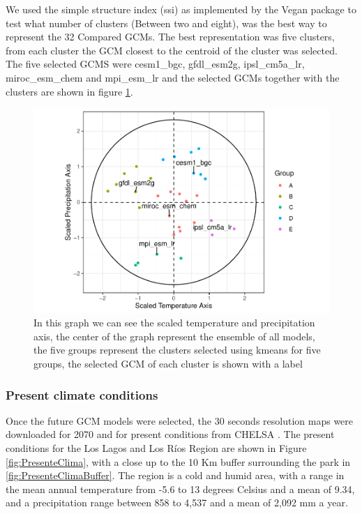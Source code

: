 \documentclass[]{article}
\begin{document}
We used the simple structure index (ssi) as implemented by the Vegan package \citep{Oksanen_2019, dolnicar1999tale} to test what number of clusters (Between two and eight), was the best way to represent the 32 Compared GCMs. The best representation was five clusters, from each cluster the GCM closest to the centroid of the cluster was selected. The five selected GCMS were cesm1\_bgc, gfdl\_esm2g, ipsl\_cm5a\_lr, miroc\_esm\_chem and mpi\_esm\_lr and the selected GCMs together with the clusters are shown in figure \ref{fig:SelectedGCMs}.

\begin{figure}
\centering
\includegraphics{Review_and_climate_files/figure-latex/SelectedGCMs-1.pdf}
\caption{\label{fig:SelectedGCMs}In this graph we can see the scaled temperature and precipitation axis, the center of the graph represent the ensemble of all models, the five groups represent the clusters selected using kmeans for five groups, the selected GCM of each cluster is shown with a label}
\end{figure}

\hypertarget{present-climate-conditions}{%
\subsubsection{Present climate conditions}\label{present-climate-conditions}}

Once the future GCM models were selected, the 30 seconds resolution maps were downloaded for 2070 and for present conditions from CHELSA \citep{karger2020high}.
The present conditions for the Los Lagos and Los Ríos Region are shown in Figure \ref{fig:PresenteClima}, with a close up to the 10 Km buffer surrounding the park in \ref{fig:PresenteClimaBuffer}. The region is a cold and humid area, with a range in the mean annual temperature from -5.6 to 13 degrees Celsius and a mean of 9.34, and a precipitation range between 858 to 4,537 and a mean of 2,092 mm a year.
\end{document}
